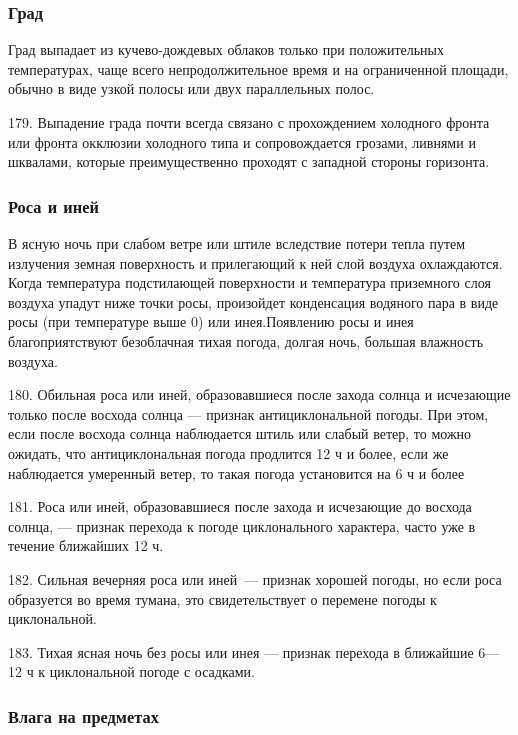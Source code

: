 \subsubsection{Град}

Град выпадает из кучево-дождевых облаков только при положительных температурах, чаще всего непродолжительное время и на ограниченной площади, обычно в виде узкой полосы или двух параллельных полос.

179. Выпадение града почти всегда связано с прохождением холодного фронта или фронта окклюзии холодного типа и сопровождается грозами, ливнями и шквалами, которые преимущественно проходят с западной стороны горизонта.

\subsubsection{Роса и иней}

В ясную ночь при слабом ветре или штиле вследствие потери тепла путем излучения земная поверхность и прилегающий к ней слой воздуха охлаждаются. Когда температура подстилающей поверхности и температура приземного слоя воздуха упадут ниже точки росы, произойдет конденсация водяного пара в виде росы (при температуре выше 0) или инея.Появлению росы и инея благоприятствуют безоблачная тихая погода, долгая ночь, большая влажность воздуха.

180. Обильная роса или иней, образовавшиеся после захода солнца и исчезающие только после восхода солнца — признак антициклональной погоды. При этом, если после восхода солнца наблюдается штиль или слабый ветер, то можно ожидать, что антициклональная погода продлится 12 ч и более, если же наблюдается умеренный ветер, то такая погода установится на 6 ч и более

181. Роса или иней, образовавшиеся после захода и исчезающие до восхода солнца, — признак перехода к погоде циклонального характера, часто уже в течение ближайших 12 ч.

182. Сильная вечерняя роса или иней~--- признак хорошей погоды, но если роса образуется во время тумана, это свидетельствует о перемене погоды к циклональной.

183. Тихая ясная ночь без росы или инея — признак перехода в ближайшие 6—12 ч к циклональной погоде с осадками.

\subsubsection{Влага на предметах}

